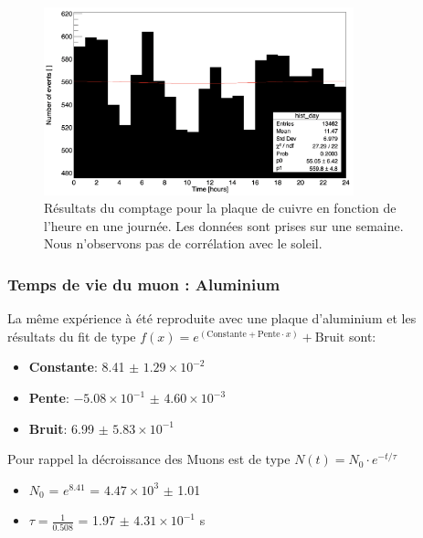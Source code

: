 \documentclass[12pt]{article}
\begin{document}
\begin{figure}[htpb!]
    \centering
    \includegraphics[width=0.8\textwidth]{graphiques/experience1/cuivre/oscillation_jour_cuivre_total_comptage.png}
    \caption{Résultats du comptage pour la plaque de cuivre en fonction de l'heure en une journée. Les données sont prises sur une semaine. Nous n'observons pas de corrélation avec le soleil.}
    \label{fig:oscillation_jour_cuivre_total}
\end{figure}


\newpage
\subsubsection{Temps de vie du muon : Aluminium}

La même expérience à été reproduite avec une plaque d'aluminium et les résultats du fit de type $f(x) = e^{(\text{Constante}+\text{Pente}\cdot x)}+\text{Bruit}$ sont: 

\begin{itemize}
    \item \textbf{Constante}: 8.41 $\pm$ $1.29\times10^{-2}$
    \item \textbf{Pente}: $-5.08\times10^{-1}$ $\pm$ $4.60\times10^{-3}$
    \item \textbf{Bruit}: 6.99 $\pm$ $5.83\times10^{-1}$
\end{itemize}
    
Pour rappel la décroissance des Muons est de type $N(t) = N_{0}\cdot e^{-t/\tau}$
\begin{itemize}
    \item $N_{0}$ = $e^{8.41}$ = $4.47\times10^{3}$ $\pm$ 1.01
    \item $\tau=\frac{1}{0.508}$ = 1.97 $\pm$ $4.31\times10^{-1}$ \SIUnitSymbolMicro s
\end{itemize}
\end{document}

